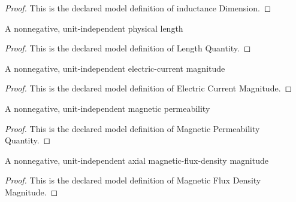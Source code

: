 \begin{proof}
  This is the declared model definition of inductance Dimension.
\end{proof}
\begin{definition}
  \label{def:physics:phyx-mini-0921:phyxminiproblems-problemphyxmini0921-lengthquantity}
  A nonnegative, unit-independent physical length
\end{definition}
\begin{proof}
  This is the declared model definition of Length Quantity.
\end{proof}
\begin{definition}
  \label{def:physics:phyx-mini-0921:phyxminiproblems-problemphyxmini0921-electriccurrentmagnitude}
  A nonnegative, unit-independent electric-current magnitude
\end{definition}
\begin{proof}
  This is the declared model definition of Electric Current Magnitude.
\end{proof}
\begin{definition}
  \label{def:physics:phyx-mini-0921:phyxminiproblems-problemphyxmini0921-magneticpermeabilityquantity}
  A nonnegative, unit-independent magnetic permeability
\end{definition}
\begin{proof}
  This is the declared model definition of Magnetic Permeability Quantity.
\end{proof}
\begin{definition}
  \label{def:physics:phyx-mini-0921:phyxminiproblems-problemphyxmini0921-magneticfluxdensitymagnitude}
  A nonnegative, unit-independent axial magnetic-flux-density magnitude
\end{definition}
\begin{proof}
  This is the declared model definition of Magnetic Flux Density Magnitude.
\end{proof}
